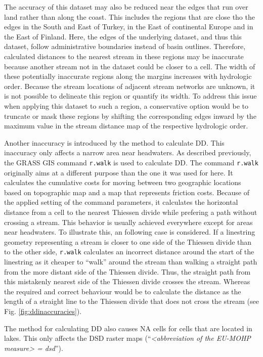 \documentclass[fleqn,10pt]{wlscirep}
\begin{document}
The accuracy of this dataset may also be reduced near the edges that run over land rather than along the coast. This includes the regions that are close tho the edges in the South and East of Turkey, in the East of continental Europe and in the East of Finland. Here, the edges of the underlying dataset, and thus this dataset, follow administrative boundaries instead of basin outlines. Therefore, calculated distances to the nearest stream in these regions may be inaccurate because another stream not in the dataset could be closer to a cell. The width of these potentially inaccurate regions along the margins increases with hydrologic order. Because the stream locations of adjacent stream networks are unknown, it is not possible to delineate this region or quantify its width. To address this issue when applying this dataset to such a region, a conservative option would be to truncate or mask these regions by shifting the corresponding edges inward by the maximum value in the stream distance map of the respective hydrologic order.

Another inaccuracy is introduced by the method to calculate DD. This inaccuracy only affects a narrow area near headwaters. As described previously, the GRASS GIS command \texttt{r.walk} is used to calculate DD. The command \texttt{r.walk} originally aims at a different purpose than the one it was used for here. It calculates the cumulative costs for moving between two geographic locations based on topographic map and a map that represents friction costs. Because of the applied setting of the command parameters, it calculates the horizontal distance from a cell to the nearest Thiessen divide while prefering a path without crossing a stream. This behavior is usually achieved everywhere except for areas near headwaters. To illustrate this, an following case is considered. If a linestring geometry representing a stream is closer to one side of the Thiessen divide than to the other side, \texttt{r.walk} calculates an incorrect distance around the start of the linestring as it cheaper to ``walk'' around the stream than walking a straight path from the more distant side of the Thiessen divide. Thus, the straight path from this mistakenly nearest side of the Thiessen divide crosses the stream. Whereas the required and correct behaviour would be to calculate the distance as the length of a straight line to the Thiessen divide that does not cross the stream (see Fig. \ref{fig:ddinaccuracies}).

The method for calculating DD also causes NA cells for cells that are located in lakes. This only affects the DSD raster maps (``\emph{\textless abbreviation of the EU-MOHP measure\textgreater{} = dsd}'').
\end{document}
